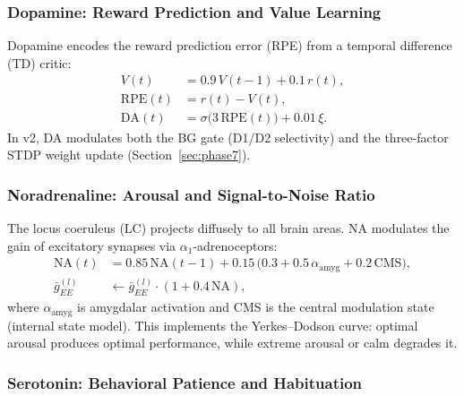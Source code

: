 \documentclass[11pt,a4paper]{article}
\begin{document}
\subsubsection{Dopamine: Reward Prediction and Value Learning}

Dopamine encodes the reward prediction error (RPE) from a temporal
difference (TD) critic:
\begin{equation}\label{eq:da_v2}
\begin{aligned}
  V(t) &= 0.9\,V(t{-}1) + 0.1\,r(t), \\
  \mathrm{RPE}(t) &= r(t) - V(t), \\
  \mathrm{DA}(t) &= \sigma\!\bigl(3\,\mathrm{RPE}(t)\bigr) + 0.01\,\xi.
\end{aligned}
\end{equation}
In v2, DA modulates both the BG gate (D1/D2 selectivity) and the
three-factor STDP weight update (Section~\ref{sec:phase7}).

\subsubsection{Noradrenaline: Arousal and Signal-to-Noise Ratio}

The locus coeruleus (LC) projects diffusely to all brain areas.
NA modulates the gain of excitatory synapses via $\alpha_1$-adrenoceptors:
\begin{equation}\label{eq:na}
\begin{aligned}
  \mathrm{NA}(t) &= 0.85\,\mathrm{NA}(t{-}1)
    + 0.15\,\bigl(0.3 + 0.5\,\alpha_\mathrm{amyg} + 0.2\,\mathrm{CMS}\bigr), \\
  \bar{g}_{EE}^{(l)} &\leftarrow \bar{g}_{EE}^{(l)} \cdot (1 + 0.4\,\mathrm{NA}),
\end{aligned}
\end{equation}
where $\alpha_\mathrm{amyg}$ is amygdalar activation and CMS is the
central modulation state (internal state model).
This implements the Yerkes--Dodson curve: optimal arousal produces
optimal performance, while extreme arousal or calm degrades it.

\subsubsection{Serotonin: Behavioral Patience and Habituation}
\end{document}
